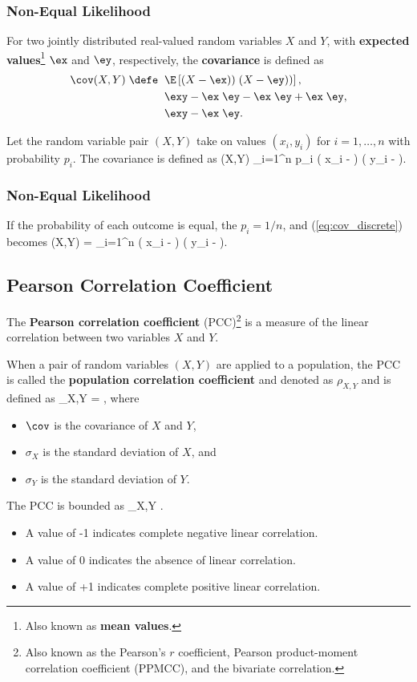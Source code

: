 \subsubsection{Non-Equal Likelihood}

For two jointly distributed real-valued random variables $X$ and $Y$, with
{\bf expected values}\footnote{Also known as {\bf mean values}.} 
$\ex$ and $\ey$, respectively, the {\bf covariance} is defined as
\begin{align}
\cov(X,Y) \; \defe \; & \; \E\left[ 
(X - \ex)) \; (X - \ey))
\right], \\
 & \; \exy - \ex \; \ey - \ex \; \ey + \ex \; \ey, \\
 & \; \exy - \ex \; \ey.
\end{align}

Let the random variable pair $(X,Y)$ take on values $(x_i, y_i)$ for
$i=1,\ldots,n$ with probability $p_i$.  The covariance is defined as
\be
\cov(X,Y)  \sum_{i=1}^n \; p_i \; \left(
x_i - \ex
\right)
\;
\left(
y_i - \ey
\right).
\label{eq:cov_discrete}
\ee

\subsubsection{Non-Equal Likelihood}
If the probability of each outcome is equal, the $p_i = 1/n$, and
(\ref{eq:cov_discrete}) becomes
\be
\cov(X,Y) =  \; \sum_{i=1}^n \; \left(
x_i - \ex
\right)
\;
\left(
y_i - \ey
\right).
\label{eq:cov_discrete_equal}
\ee

\subsection{Pearson Correlation Coefficient}
The {\bf Pearson correlation coefficient} (PCC)\footnote{Also known as the
Pearson's $r$ coefficient, Pearson product-moment correlation
coefficient (PPMCC), and the bivariate correlation.} is a 
measure of the linear correlation between two variables 
$X$ and $Y$.  

When a pair of random variables $(X,Y)$ are applied to a population, the PCC
is called the {\bf population correlation coefficient} and denoted as 
$\rho_{X,Y}$ and is defined as 
\be
\rho_{X,Y} = , 
\ee
where 
\begin{itemize}
\item $\cov$ is the covariance of $X$ and $Y$, 
\item $\sigma_X$ is the standard deviation of $X$, and 
\item $\sigma_Y$ is the standard deviation of $Y$.
\end{itemize}
The PCC is bounded as
 \leq \rho_{X,Y} .
\ee
\begin{itemize}
\item A value of -1 indicates complete negative linear correlation.
\item A value of  0 indicates the absence of linear correlation.
\item A value of +1 indicates complete positive linear correlation.
\end{itemize}

